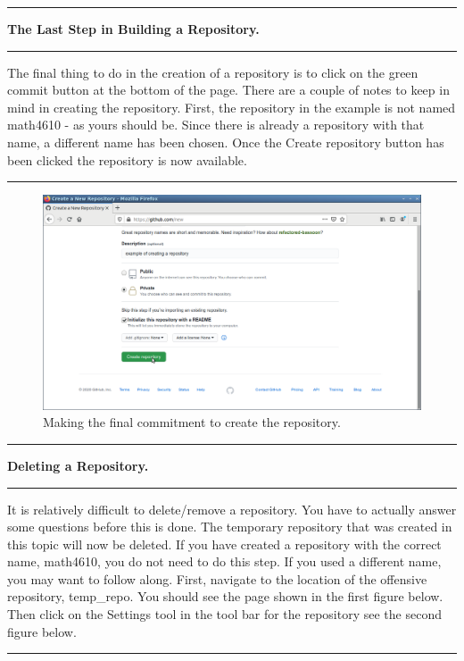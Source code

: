 \documentclass[10pt,fleqn]{article}
\begin{document}
\eject
\vskip0.1in\hrule\vskip0.1in\noindent
{\bf The Last Step in Building a Repository.} 
\vskip0.1in\hrule\vskip0.1in\noindent
The final thing to do in the creation of a repository is to click on the green
commit button at the bottom of the page. There are a couple of notes to keep in
mind in creating the repository. First, the repository in the example is not
named math4610 - as yours should be. Since there is already a repository with
that name, a different name has been chosen. Once the Create repository button
has been clicked the repository is now available.
\vskip0.1in\hrule\vskip0.1in
\vfill
\begin{figure}[h]
\centering
\includegraphics[width=5.0in]{../images/github_09.png}
\caption{Making the final commitment to create the repository.}
\end{figure}
\eject
\vskip0.1in\hrule\vskip0.1in\noindent
{\bf Deleting a Repository.} 
\vskip0.1in\hrule\vskip0.1in\noindent
It is relatively difficult to delete/remove a repository. You have to actually
answer some questions before this is done. The temporary repository that was
created in this topic will now be deleted. If you have created a repository with
the correct name, math4610, you do not need to do this step. If you used a
different name, you may want to follow along. First, navigate to the location of
the offensive repository, temp\_repo. You should see the page shown in the first
figure below. Then click on the Settings tool in the tool bar for the repository
see the second figure below.
\vskip0.1in\hrule\vskip0.1in
\vfill
\end{document}
